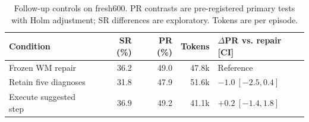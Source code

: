 \begin{table}[tbp]
\caption{Follow-up controls on fresh600. PR contrasts are pre-registered primary tests with Holm adjustment; SR differences are exploratory. Tokens are per episode.}
\label{tab:followups}\centering
\begin{tabular}{lrrrl}\toprule
Condition & SR (\%) & PR (\%) & Tokens & $\Delta$PR vs. repair [CI]\\\midrule
Frozen WM repair & 36.2 & 49.0 & 47.8k & Reference\\
Retain five diagnoses & 31.8 & 47.9 & 51.6k & $-1.0\ [-2.5,0.4]$\\
Execute suggested step & 36.9 & 49.2 & 41.1k & $+0.2\ [-1.4,1.8]$\\\bottomrule
\end{tabular}
\end{table}
